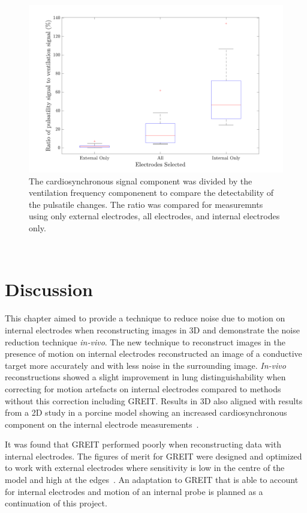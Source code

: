 \begin{figure}
    \centering
	\includegraphics[width=\textwidth]{chapter7-internal_elec_motion/imgs/amplitude_ratio.pdf} 
	\caption[Results of the probe location correction]{\label{fig:amplitude_ratio} 
	The cardiosynchronous signal component was divided by the ventilation frequency 
	componenent to compare the detectability of the pulsatile changes. The ratio was compared 
	for measuremnts using only external electrodes, all electrodes, and internal electrodes only.}
\end{figure}~

\section{Discussion}

This chapter aimed to provide a technique to reduce noise due to motion on internal
electrodes when reconstructing images in 3D and demonstrate the noise reduction technique
\emph{in-vivo}. The new technique to reconstruct images in the presence of motion 
on internal electrodes reconstructed an image of a conductive target 
more accurately and with less noise in the surrounding image. \emph{In-vivo}
reconstructions showed a slight improvement in lung distinguishability when correcting
for motion artefacts on internal electrodes compared to methods without this correction 
including GREIT. Results in 3D also aligned with results from a 2D study in a porcine 
model showing an increased cardiosynchronous component on the internal electrode 
measurements~\parencite{czaplik_application_2014}.

It was found that GREIT performed poorly when reconstructing data with internal electrodes.
The figures of merit for GREIT were designed and optimized to work with external electrodes 
where sensitivity is low in the centre of the model and high at the 
edges~\parencite{adler_greit_2009}. An adaptation to GREIT that is able to 
account for internal electrodes and motion of an internal probe is planned as a
continuation of this project.  


